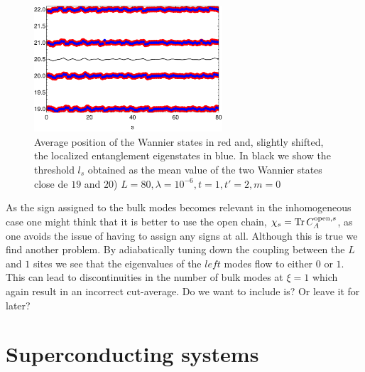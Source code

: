 \documentclass[twocolumn,amsmath,longbibliography,amssymb,superscriptaddress]{revtex4-1}
\newcommand{\carlos}[1]{{\color{red} #1}}
\begin{document}
\begin{figure}[h!]
\centering
\includegraphics[width=70mm]{loc_fix.pdf}
\caption{Average position of the Wannier states in red and, slightly shifted, the localized entanglement eigenstates 
in blue. In black we show the threshold $l_s$ obtained as the mean value of the two Wannier states close de $19$ and $20$) $L=80,\lambda=10^{-6}, t = 1, t'= 2, m=0$}
\label{fig:loc_fix}
\end{figure}




As the sign assigned to the bulk modes becomes relevant in the inhomogeneous case one might think that it is better to use the open chain, $\chi_s = \Tr C_A^{{\rm open},s}$, as one avoids the issue of having to assign any signs at all. Although this is true we find another problem. By adiabatically tuning down the coupling between the $L$ and $1$ sites we see that the eigenvalues of the $left$ modes flow to either $0$ or $1$. This can lead to discontinuities in the number of bulk modes at $\xi=1$ which again result in an incorrect cut-average. \carlos{Do we want to include is? Or leave it for later?}



\section{Superconducting systems}
\end{document}
